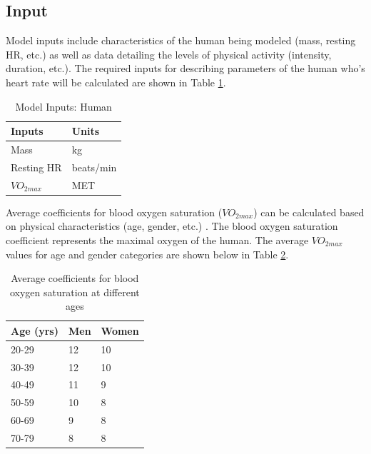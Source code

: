 \documentclass[paper=a4, fontsize=11pt]{scrartcl}
\numberwithin{equation}{section}		%
\numberwithin{figure}{section}			%
\numberwithin{table}{section}		    %
\begin{document}
\subsection{Input} \label{sec:model_in}
Model inputs include characteristics of the human being modeled (mass, resting HR, etc.) as well
as data detailing the levels of physical activity (intensity, duration, etc.). The required 
inputs for describing parameters of the human who's heart rate will be calculated are shown in
Table \ref{tbl:human}. 

\begin{table}[h]
	\centering
	\caption{Model Inputs: Human}
	\label{tbl:human}
	\begin{tabular}{|l|l|}
		\hline
		\textbf{Inputs} & \textbf{Units} \\ \hline
		Mass            & kg             \\ \hline
		Resting HR      & beats/min      \\ \hline
		$VO_{2max}$     & MET            \\ \hline
	\end{tabular}
\end{table}

Average coefficients for blood oxygen saturation ($VO_{2max}$) can be calculated based on 
physical characteristics (age, gender, etc.) \cite{balady1995exercise}. The blood oxygen 
saturation coefficient represents the maximal oxygen of the human. The average $VO_{2max}$ 
values for age and gender categories are shown below in Table \ref{tbl:vo2max}.

\begin{table}[h]
	\centering
	\caption{Average coefficients for blood oxygen saturation at different ages
		\cite{balady1995exercise}}
	\label{tbl:vo2max}
	\begin{tabular}{|l|l|l|}
		\hline
		\textbf{Age (yrs)} & \textbf{Men} & \textbf{Women} \\ \hline
		20-29              & 12           & 10             \\ \hline
		30-39              & 12           & 10             \\ \hline
		40-49              & 11           & 9              \\ \hline
		50-59              & 10           & 8              \\ \hline
		60-69              & 9            & 8              \\ \hline
		70-79              & 8            & 8              \\ \hline
	\end{tabular}
\end{table}
\end{document}
